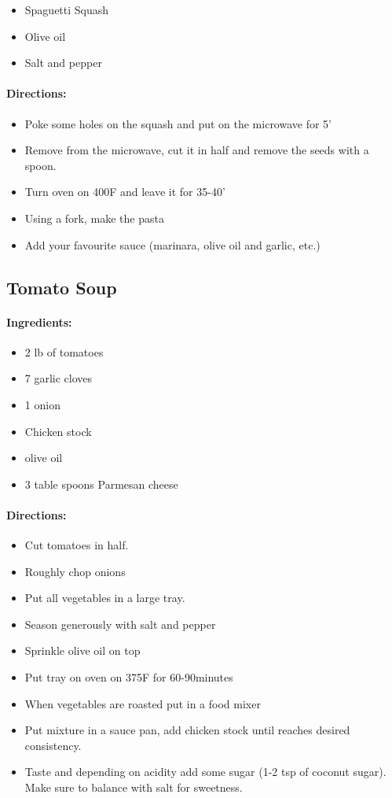 \documentclass{article}
\begin{document}
\begin{itemize}
	\item Spaguetti Squash
	\item Olive oil
	\item Salt and pepper
	
\end{itemize}

\paragraph{Directions:}
\begin{itemize}
	\item Poke some holes on the squash and put on the microwave for 5'
	\item Remove from the microwave, cut it in half and remove the seeds with a spoon.
	\item Turn oven on 400F and leave it for 35-40'
	\item Using a fork, make the pasta
	\item Add your favourite sauce (marinara, olive oil and garlic, etc.)
\end{itemize}

\subsection{Tomato Soup}

\paragraph{Ingredients:}
\begin{itemize}
	\item 2 lb of tomatoes
	\item 7 garlic cloves
	\item 1 onion
	\item Chicken stock
	\item olive oil
	\item 3 table spoons Parmesan cheese
\end{itemize}

\paragraph{Directions:}
\begin{itemize}
	\item Cut tomatoes in half.
	\item Roughly chop onions
	\item Put all vegetables in a large tray.
	\item Season generously with salt and pepper
	\item Sprinkle olive oil on top
	\item Put tray on oven on 375F for 60-90minutes
	\item When vegetables are roasted put in a food mixer
	\item Put mixture in a sauce pan, add chicken stock until reaches desired consistency.
	\item Taste and depending on acidity add some sugar (1-2 tsp of coconut sugar). Make sure to balance with salt for sweetness.
\end{itemize}
\end{document}

